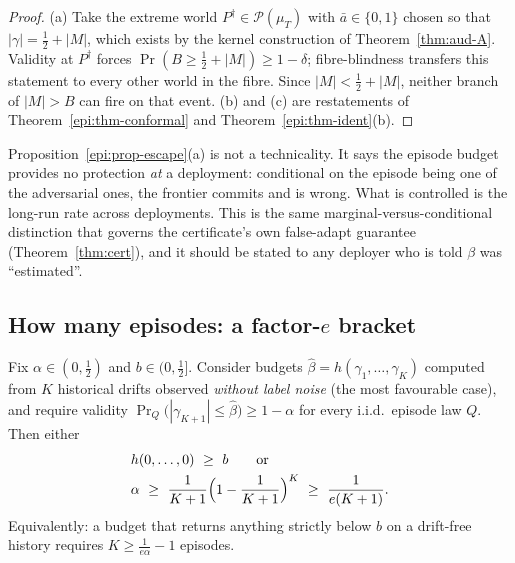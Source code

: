 \begin{proof}
(a) Take the extreme world $P^\dagger\in\mathcal P(\mu_T)$ with $\bar a\in\{0,1\}$ chosen so that
$|\gamma|=\tfrac12+|M|$, which exists by the kernel construction of Theorem~\ref{thm:aud-A}. Validity
at $P^\dagger$ forces $\Pr(B\ge\tfrac12+|M|)\ge1-\delta$; fibre-blindness transfers this statement to
every other world in the fibre. Since $|M|<\tfrac12+|M|$, neither branch of $|M|>B$ can fire on that
event. (b) and (c) are restatements of Theorem~\ref{epi:thm-conformal} and
Theorem~\ref{epi:thm-ident}(b).
\end{proof}

\begin{remark}\label{epi:rem-marginal}
Proposition~\ref{epi:prop-escape}(a) is not a technicality. It says the episode budget provides no
protection \emph{at} a deployment: conditional on the episode being one of the adversarial ones, the
frontier commits and is wrong. What is controlled is the long-run rate across deployments. This is
the same marginal-versus-conditional distinction that governs the certificate's own false-adapt guarantee (Theorem~\ref{thm:cert}), and it should be
stated to any deployer who is told $\beta$ was ``estimated''.
\end{remark}

\subsection{How many episodes: a factor-$e$ bracket}

\begin{theorem}\label{epi:thm-floor}
Fix $\alpha\in(0,\tfrac12)$ and $b\in(0,\tfrac12]$. Consider budgets
$\widehat\beta=h(\gamma_1,\dots,\gamma_K)$ computed from $K$ historical drifts observed
\emph{without label noise} (the most favourable case), and require validity
$\Pr_{Q}\bigl(|\gamma_{K+1}|\le\widehat\beta\bigr)\ge1-\alpha$ for every i.i.d.\ episode law $Q$.
Then either
\[
\begin{aligned}
&h(0,\dots,0)\ \ge\ b\qquad\text{or}\\
&\alpha\ \ge\ \frac1{K+1}\Bigl(1-\frac1{K+1}\Bigr)^{K}\ \ge\ \frac1{e(K+1)} .
\end{aligned}
\]
Equivalently: a budget that returns anything strictly below $b$ on a drift-free history requires
$K\ge\tfrac1{e\alpha}-1$ episodes.
\end{theorem}

